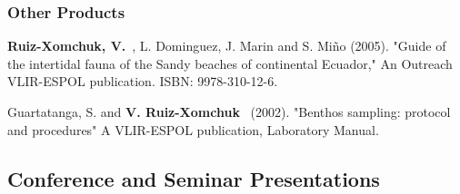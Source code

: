 \documentclass[10pt,letterpaper]{article}
\newcommand{\vrx}{\textbf{V. Ruiz-Xomchuk}}
\newcommand{\rxv}{\textbf{Ruiz-Xomchuk, V.}}
\renewenvironment{itemize}{
  \begin{list}{}{
    \setlength{\leftmargin}{1.5em}
    \setlength{\itemsep}{0.25em}
    \setlength{\parskip}{0pt}
    \setlength{\parsep}{0.25em}
  }
}{
  \end{list}
}
\begin{document}
\subsubsection*{Other Products}

\begin{itemize}

\item \rxv~, L. Dominguez,  J. Marin and S. Mi\~no (2005). "Guide of the intertidal fauna of the Sandy beaches of continental Ecuador," An Outreach VLIR-ESPOL publication. ISBN: 9978-310-12-6.

Guartatanga, S. and \vrx~ (2002). "Benthos sampling: protocol and procedures" A VLIR-ESPOL publication, Laboratory Manual.

\end{itemize}

\subsection*{Conference and Seminar Presentations}
\end{document}
